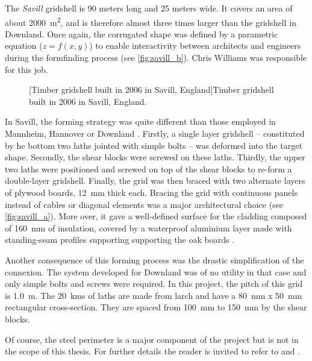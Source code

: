 The \emph{Savill} gridshell is 90 meters long and 25 meters wide. It covers an area of about \SI{2000}{m^2}, and is therefore almost three times larger than the gridshell in Downland. Once again, the corrugated shape was defined by a parametric equation ($z = f(x,y)$) to enable interactivity between architects and engineers during the formfinding process (see \cref{fig:savill_b}). Chris Williams was responsible for this job.
 \begin{figure}[t]
		\hspace*{\fill}
		\vspace{10pt}
		[Timber gridshell built in 2006 in Savill, England]{Timber gridshell built in 2006 in Savill, England.}
		\label{fig:savill} 
\end{figure}

In Savill, the forming strategy was quite different than those employed in Mannheim, Hannover or Downland \cite{Harris2008}. Firstly, a single layer gridshell -- constituted by he bottom two laths jointed with simple bolts -- was deformed into the target shape. Secondly, the shear blocks were screwed on these laths. Thirdly, the upper two laths were positioned and screwed on top of the shear blocks to re-form a double-layer gridshell. Finally, the grid was then braced with two alternate layers of plywood boards, \SI{12}{mm} thick each. Bracing the grid with continuous panels instead of cables or diagonal elements was a major architectural choice (see \cref{fig:savill_a}). More over, it gave a well-defined surface for the cladding composed of \SI{160}{mm} of insulation, covered by a waterproof aluminium layer made with standing-seam profiles supporting supporting the oak boards \cite{Trada2006}.

Another consequence of this forming process was the drastic simplification of the connexion. The system developed for Downland was of no utility in that case and only simple bolts and screws were required. In this project, the pitch of this grid is \SI{1.0}{m}. The \SI{20}{kms} of laths are made from larch and have a \SI{80}{mm} x \SI{50}{mm} rectangular cross-section. They are spaced from \SI{100}{mm} to \SI{150}{mm} by the shear blocks.

Of course, the steel perimeter is a major component of the project but is not in the scope of this thesis. For further details the reader is invited to refer to \citet{Harris2008} and \citet{Trada2006}. 

